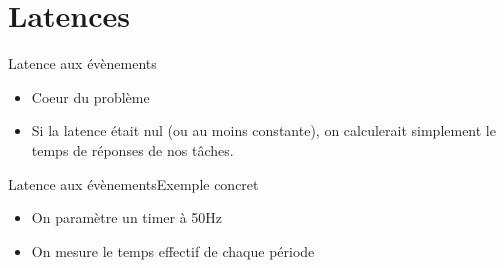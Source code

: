 



\section{Latences}

\begin{frame}{Latence aux évènements}
  \begin{itemize}
    \item Coeur du problème
    \item Si la latence était  nul (ou au moins constante), on calculerait
      simplement le temps de réponses de nos tâches.
  \end{itemize}

  \begin{center}
    
  \end{center}
\end{frame}

\begin{frame}{Latence aux évènements}{Exemple concret}
  \begin{itemize}
  \item On paramètre un timer à 50Hz
  \item On mesure le temps effectif de chaque période
  \end{itemize}
  \begin{center}
  \end{center}
\end{frame}

